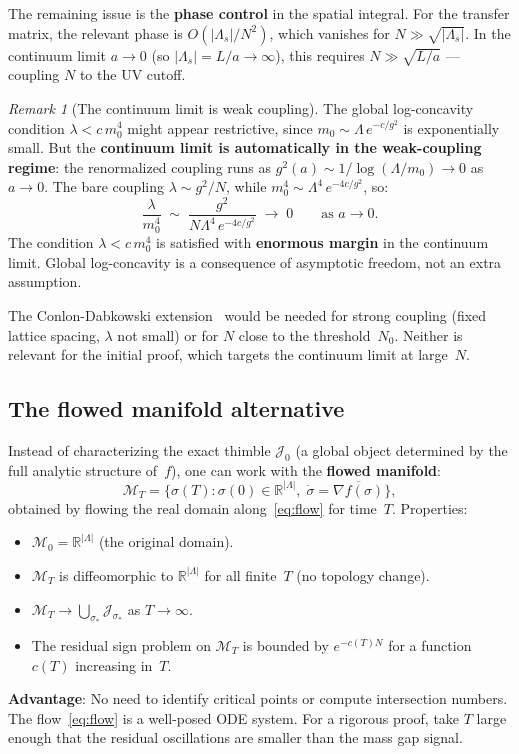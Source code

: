 \documentclass[12pt]{article}
\theoremstyle{definition}
\theoremstyle{remark}
\newtheorem{remark}[theorem]{Remark}
\newcommand{\R}{\mathbb{R}}
\newcommand{\La}{\Lambda}
\begin{document}
The remaining issue is the \textbf{phase control} in the spatial
integral. For the transfer matrix, the relevant phase is
$O(|\La_s|/N^2)$, which vanishes for $N \gg \sqrt{|\La_s|}$.
In the continuum limit $a \to 0$ (so $|\La_s| = L/a \to \infty$),
this requires $N \gg \sqrt{L/a}$ --- coupling $N$ to the
UV cutoff.

\begin{remark}[The continuum limit is weak coupling]
\label{rmk:weak_coupling}
The global log-concavity condition $\lambda < c\,m_0^4$ might
appear restrictive, since $m_0 \sim \La\,e^{-c/g^2}$ is
exponentially small. But the \textbf{continuum limit is
automatically in the weak-coupling regime}: the renormalized
coupling runs as $g^2(a) \sim 1/\log(\La/m_0) \to 0$ as
$a \to 0$. The bare coupling $\lambda \sim g^2/N$, while
$m_0^4 \sim \La^4\,e^{-4c/g^2}$, so:
\begin{equation}
  \frac{\lambda}{m_0^4}
    \;\sim\; \frac{g^2}{N\La^4\,e^{-4c/g^2}}
    \;\to\; 0
    \qquad\text{as } a \to 0.
\end{equation}
The condition $\lambda < c\,m_0^4$ is satisfied with
\textbf{enormous margin} in the continuum limit. Global
log-concavity is a consequence of asymptotic freedom, not an
extra assumption.

The Conlon-Dabkowski extension~\cite{CD24} would be needed for
strong coupling (fixed lattice spacing, $\lambda$ not small) or
for $N$ close to the threshold~$N_0$. Neither is relevant for
the initial proof, which targets the continuum limit at
large~$N$.
\end{remark}

\subsection{The flowed manifold alternative}

Instead of characterizing the exact thimble $\mathcal{J}_0$
(a global object determined by the full analytic structure of~$f$),
one can work with the \textbf{flowed manifold}:
\begin{equation}
  \mathcal{M}_T = \bigl\{\sigma(T) : \sigma(0) \in \R^{|\La|},\;
    \dot\sigma = \overline{\nabla f(\sigma)}\bigr\},
\end{equation}
obtained by flowing the real domain along~\eqref{eq:flow} for
time~$T$. Properties:
\begin{itemize}
\item $\mathcal{M}_0 = \R^{|\La|}$ (the original domain).
\item $\mathcal{M}_T$ is diffeomorphic to $\R^{|\La|}$ for all
  finite~$T$ (no topology change).
\item $\mathcal{M}_T \to \bigcup_{\sigma_*}\mathcal{J}_{\sigma_*}$
  as $T \to \infty$.
\item The residual sign problem on $\mathcal{M}_T$ is bounded by
  $e^{-c(T)N}$ for a function $c(T)$ increasing in~$T$.
\end{itemize}
\textbf{Advantage}: No need to identify critical points or compute
intersection numbers. The flow~\eqref{eq:flow} is a well-posed ODE
system. For a rigorous proof, take $T$ large enough that the residual
oscillations are smaller than the mass gap signal.
\end{document}
